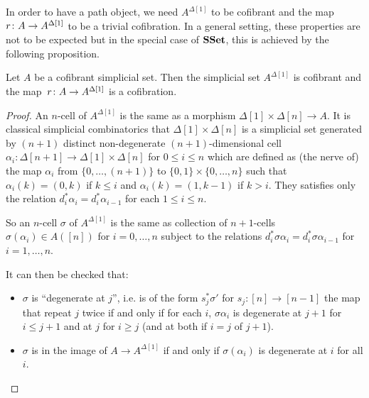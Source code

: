 \documentclass[reqno,10pt,a4paper,oneside,draft]{amsart}
\begin{document}
In order to have a path object, we need $A^{\Delta[1]}$ to be cofibrant and the map $r \colon A \rightarrow A^{\Delta[1]}$ to be a trivial cofibration. In a general setting, these properties are not to be expected
but in the special case of $\mathbf{SSet}$, this is achieved by the following proposition.

\begin{proposition}\label{proposition:PathObjectCofibrant}
Let $A$ be a cofibrant simplicial set. Then the simplicial set $A^{\Delta[1]}$ is cofibrant and the map~$r \colon A \rightarrow A^{\Delta[1]}$ is a cofibration.
\end{proposition}



\begin{proof}
An $n$-cell of $A^{\Delta[1]}$ is the same as a morphism $\Delta[1] \times \Delta[n] \rightarrow A$. It is classical simplicial combinatorics that $\Delta[1] \times \Delta[n]$ is a simplicial set generated by $(n+1)$ distinct non-degenerate $(n+1)$-dimensional cell $\alpha_i: \Delta[n+1] \rightarrow \Delta[1] \times \Delta[n]$ for $0 \leqslant i \leqslant n$ which are defined as (the nerve of) the map $\alpha_i$ from $\{0,\dots,(n+1)\}$ to $\{0,1\} \times \{0,\dots,n\}$ such that $\alpha_i(k)=(0,k)$ if $k \leqslant i$ and $\alpha_i(k)=(1,k-1)$ if $k>i$. They satisfies only the relation $d_i^* \alpha_i = d_{i}^* \alpha_{i-1}$ for each $1 \leqslant i \leqslant n$.

So an $n$-cell $\sigma$ of $A^{\Delta[1]}$ is the same as collection of $n+1$-cells $\sigma(\alpha_i) \in A([n])$ for $i=0,\dots,n$ subject to the relations $d_i^* \sigma \alpha_i = d_{i}^* \sigma \alpha_{i-1}$ for $i=1,\dots,n$.


It can then be checked that:

\begin{itemize}

\item $\sigma$ is ``degenerate at $j$'', i.e. is of the form $s_j ^* \sigma'$ for $s_j : [n] \rightarrow [n-1]$ the map that repeat $j$ twice if and only if for each $i$, $\sigma \alpha_i $ is degenerate at $j+1$ for $i \leqslant j+1$ and at $j$ for $i \geqslant j$ (and at both if $i=j$ of $j+1$).

\item $\sigma$ is in the image of $A \rightarrow A^{\Delta[1]}$ if and only if $\sigma(\alpha_i)$ is degenerate at $i$ for all $i$.

\end{itemize}



\end{proof}
\end{document}
